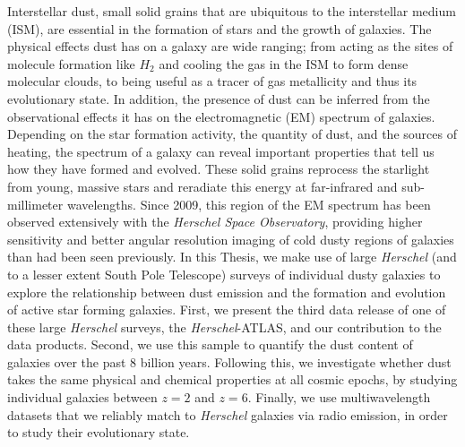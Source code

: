 Interstellar dust, small solid grains that are ubiquitous to the interstellar medium (ISM), are essential in the formation of stars and the growth of galaxies. The physical effects dust has on a galaxy are wide ranging; from acting as the sites of molecule formation like $H_2$ and cooling the gas in the ISM to form dense molecular clouds, to being useful as a tracer of gas metallicity and thus its evolutionary state. In addition, the presence of dust can be inferred from the observational effects it has on the electromagnetic (EM) spectrum of galaxies. Depending on the star formation activity, the quantity of dust, and the sources of heating, the spectrum of a galaxy can reveal important properties that tell us how they have formed and evolved. These solid grains reprocess the starlight from young, massive stars and reradiate this energy at far-infrared and sub-millimeter wavelengths. Since 2009, this region of the EM spectrum has been observed extensively with the \textit{Herschel Space Observatory}, providing higher sensitivity and better angular resolution imaging of cold dusty regions of galaxies than had been seen previously. In this Thesis, we make use of large \textit{Herschel} (and to a lesser extent South Pole Telescope) surveys of individual dusty galaxies to explore the relationship between dust emission and the formation and evolution of active star forming galaxies. First, we present the third data release of one of these large \textit{Herschel} surveys, the \textit{Herschel}-ATLAS, and our contribution to the data products. Second, we use this sample to quantify the dust content of galaxies over the past $8$ billion years. Following this, we investigate whether dust takes the same physical and chemical properties at all cosmic epochs, by studying individual galaxies between $z = 2$ and $z = 6$. Finally, we use multiwavelength datasets that we reliably match to \textit{Herschel} galaxies via radio emission, in order to study their evolutionary state.
